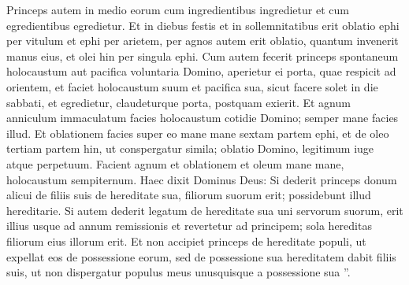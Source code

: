 \begin{biblechapter}
\begin{biblechapter}
\begin{biblechapter}
\begin{biblechapter}
\begin{biblechapter}
\begin{biblechapter}
\begin{biblechapter}
\begin{biblechapter}
\begin{biblechapter}
\begin{biblechapter}
\begin{biblechapter}
\begin{biblechapter}
\begin{biblechapter}
\begin{biblechapter}
\begin{biblechapter}
\begin{biblechapter}
\begin{biblechapter}
\begin{biblechapter}
\begin{biblechapter}
\begin{biblechapter}
\begin{biblechapter}
\begin{biblechapter}
\begin{biblechapter}
\begin{biblechapter}
\begin{biblechapter}
\begin{biblechapter}
\begin{biblechapter}
\begin{biblechapter}
\begin{biblechapter}
\begin{biblechapter}
\begin{biblechapter}
\begin{biblechapter}
\begin{biblechapter}
\begin{biblechapter}
\begin{biblechapter}
\begin{biblechapter}
\begin{biblechapter}
\begin{biblechapter}
\begin{biblechapter}
\begin{biblechapter}
\begin{biblechapter}
\begin{biblechapter}
\begin{biblechapter}
\begin{biblechapter}
\begin{biblechapter}
\begin{biblechapter}
\verse Princeps autem in medio eorum cum ingredientibus ingredietur et cum egredientibus egredietur. 
\verse Et in diebus festis et in sollemnitatibus erit oblatio ephi per vitulum et ephi per arietem, per agnos autem erit oblatio, quantum invenerit manus eius, et olei hin per singula ephi. 
\verse Cum autem fecerit princeps spontaneum holocaustum aut pacifica voluntaria Domino, aperietur ei porta, quae respicit ad orientem, et faciet holocaustum suum et pacifica sua, sicut facere solet in die sabbati, et egredietur, claudeturque porta, postquam exierit.
 \verse Et agnum anniculum immaculatum facies holocaustum cotidie Domino; semper mane facies illud. 
\verse Et oblationem facies super eo mane mane sextam partem ephi, et de oleo tertiam partem hin, ut conspergatur simila; oblatio Domino, legitimum iuge atque perpetuum. 
\verse Facient agnum et oblationem et oleum mane mane, holocaustum sempiternum.
 \verse Haec dixit Dominus Deus: Si dederit princeps donum alicui de filiis suis de hereditate sua, filiorum suorum erit; possidebunt illud hereditarie. 
\verse Si autem dederit legatum de hereditate sua uni servorum suorum, erit illius usque ad annum remissionis et revertetur ad principem; sola hereditas filiorum eius illorum erit. 
\verse Et non accipiet princeps de hereditate populi, ut expellat eos de possessione eorum, sed de possessione sua hereditatem dabit filiis suis, ut non dispergatur populus meus unusquisque a possessione sua ”.

\end{biblechapter}
\end{biblechapter}
\end{biblechapter}
\end{biblechapter}
\end{biblechapter}
\end{biblechapter}
\end{biblechapter}
\end{biblechapter}
\end{biblechapter}
\end{biblechapter}
\end{biblechapter}
\end{biblechapter}
\end{biblechapter}
\end{biblechapter}
\end{biblechapter}
\end{biblechapter}
\end{biblechapter}
\end{biblechapter}
\end{biblechapter}
\end{biblechapter}
\end{biblechapter}
\end{biblechapter}
\end{biblechapter}
\end{biblechapter}
\end{biblechapter}
\end{biblechapter}
\end{biblechapter}
\end{biblechapter}
\end{biblechapter}
\end{biblechapter}
\end{biblechapter}
\end{biblechapter}
\end{biblechapter}
\end{biblechapter}
\end{biblechapter}
\end{biblechapter}
\end{biblechapter}
\end{biblechapter}
\end{biblechapter}
\end{biblechapter}
\end{biblechapter}
\end{biblechapter}
\end{biblechapter}
\end{biblechapter}
\end{biblechapter}
\end{biblechapter}
